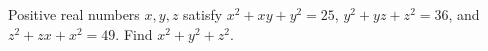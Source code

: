 Positive real numbers $x,y,z$ satisfy $x^2+xy+y^2=25$, $y^2+yz+z^2=36$, and $z^2+zx+x^2=49$. Find $x^2+y^2+z^2$.
